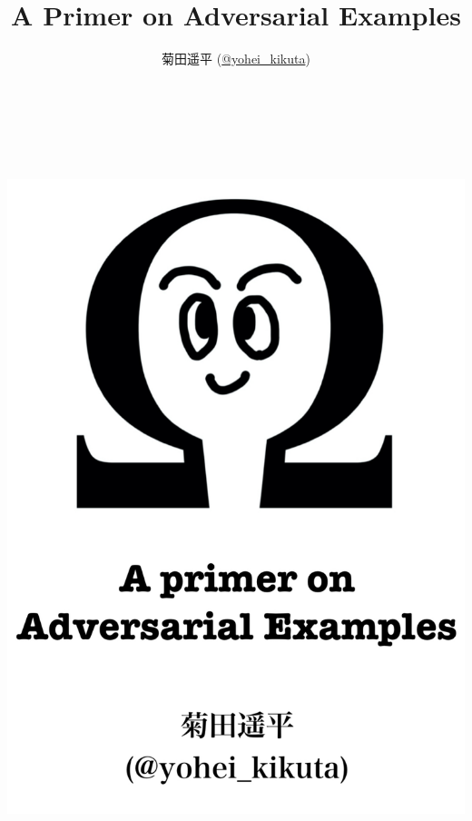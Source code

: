 \documentclass[dvipdfmx,autodetect-engine]{jsarticle}
\title{A Primer on Adversarial Examples}
\author{菊田遥平 (\href{https://twitter.com/yohei_kikuta}{@yohei\_kikuta})}
\begin{document}
\enlargethispage{\paperwidth}
\thispagestyle{empty}
\vspace*{1.0cm}
\vspace*{-\topmargin}
\vspace*{-\headheight}
\vspace*{-\headsep}
\vspace*{-\topskip}
\includegraphics[width=15.5cm,height=22.0cm]{figures/cover.pdf}

\maketitle
\end{document}
